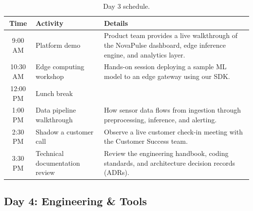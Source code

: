 \documentclass[
    language=english,
    doctype=onboarding-guide,
    institution=none,
]{../../omnilatex}
\begin{document}
\begin{table}[h]
    \centering
    \begin{tabular}{clp{7cm}}
        \toprule
        \textbf{Time} & \textbf{Activity} & \textbf{Details} \\
        \midrule
        9:00 AM  & Platform demo & Product team provides a live walkthrough
            of the NovaPulse dashboard, edge inference engine, and analytics
            layer. \\
        10:30 AM & Edge computing workshop & Hands-on session deploying a
            sample ML model to an edge gateway using our SDK. \\
        12:00 PM & Lunch break & \\
        1:00 PM  & Data pipeline walkthrough & How sensor data flows from
            ingestion through preprocessing, inference, and alerting. \\
        2:30 PM  & Shadow a customer call & Observe a live customer check-in
            meeting with the Customer Success team. \\
        3:30 PM  & Technical documentation review & Review the engineering
            handbook, coding standards, and architecture decision records
            (ADRs). \\
        \bottomrule
    \end{tabular}
    \caption{Day 3 schedule.}
\end{table}

\subsection{Day 4: Engineering \& Tools}
\end{document}
